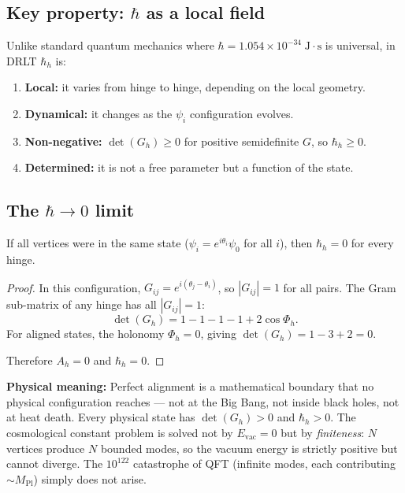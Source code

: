 \subsection{Key property: $\hbar$ as a local field}

Unlike standard quantum mechanics where $\hbar = 1.054 \times 10^{-34}\;\text{J}\cdot\text{s}$ is universal, in DRLT $\hbar_h$ is:

\begin{enumerate}
\item \textbf{Local:} it varies from hinge to hinge, depending on the local geometry.
\item \textbf{Dynamical:} it changes as the $\psi_i$ configuration evolves.
\item \textbf{Non-negative:} $\det(G_h) \geq 0$ for positive semidefinite $G$, so $\hbar_h \geq 0$.
\item \textbf{Determined:} it is not a free parameter but a function of the state.
\end{enumerate}

\subsection{The $\hbar \to 0$ limit}

\begin{proposition}
If all vertices were in the same state ($\psi_i = e^{i\theta_i}\psi_0$ for all $i$), then $\hbar_h = 0$ for every hinge.
\end{proposition}

\begin{proof}
In this configuration, $G_{ij} = e^{i(\theta_j - \theta_i)}$, so $|G_{ij}| = 1$ for all pairs. The Gram sub-matrix of any hinge has all $|G_{ij}| = 1$:
\begin{equation}
\det(G_h) = 1 - 1 - 1 - 1 + 2\cos\Phi_h.
\end{equation}
For aligned states, the holonomy $\Phi_h = 0$, giving $\det(G_h) = 1 - 3 + 2 = 0$.

Therefore $A_h = 0$ and $\hbar_h = 0$.
\end{proof}

\textbf{Physical meaning:} Perfect alignment is a mathematical boundary that no physical configuration reaches --- not at the Big Bang, not inside black holes, not at heat death. Every physical state has $\det(G_h) > 0$ and $\hbar_h > 0$. The cosmological constant problem is solved not by $E_\text{vac} = 0$ but by \emph{finiteness}: $N$ vertices produce $N$ bounded modes, so the vacuum energy is strictly positive but cannot diverge. The $10^{122}$ catastrophe of QFT (infinite modes, each contributing $\sim M_\text{Pl}$) simply does not arise.

